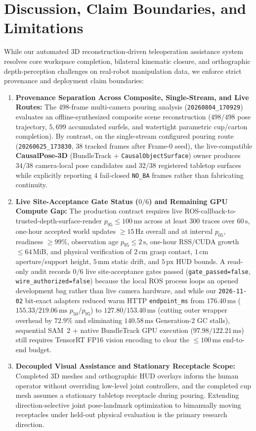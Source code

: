 \documentclass[10pt,journal]{IEEEtran}
\begin{document}
\section{Discussion, Claim Boundaries, and Limitations}
\label{sec:discussion}
While our automated 3D reconstruction-driven teleoperation assistance system resolves core workspace completion, bilateral kinematic closure, and orthographic depth-perception challenges on real-robot manipulation data, we enforce strict provenance and deployment claim boundaries:
\begin{enumerate}
    \item \textbf{Provenance Separation Across Composite, Single-Stream, and Live Routes:} The 498-frame multi-camera pouring analysis (\texttt{20260804\_170929}) evaluates an offline-synthesized composite scene reconstruction ($498/498$ pose trajectory, $5{,}699$ accumulated surfels, and watertight parametric cup/carton completion). By contrast, on the single-stream configured pouring route (\texttt{20260625\_173830}, $38$ tracked frames after Frame-0 seed), the live-compatible \textbf{CausalPose-3D} (BundleTrack + \texttt{CausalObjectSurface}) owner produces $34/38$ camera-local pose candidates and $32/38$ registered tabletop surfaces while explicitly reporting $4$ fail-closed \texttt{NO\_BA} frames rather than fabricating continuity.
    \item \textbf{Live Site-Acceptance Gate Status ($0/6$) and Remaining GPU Compute Gap:} The production contract requires live ROS-callback-to-trusted-depth-surface-render $p_{95} \le 100\,\mathrm{ms}$ across at least $300$ traces over $60\,\mathrm{s}$, one-hour accepted world updates $\ge 15\,\mathrm{Hz}$ overall and at interval $p_{05}$, readiness $\ge 99\%$, observation age $p_{95} \le 2\,\mathrm{s}$, one-hour RSS/CUDA growth $\le 64\,\mathrm{MiB}$, and physical verification of $2\,\mathrm{cm}$ grasp contact, $1\,\mathrm{cm}$ aperture/support height, $5\,\mathrm{mm}$ static drift, and $5\,\mathrm{px}$ HUD bounds. A read-only audit records $0/6$ live site-acceptance gates passed (\texttt{gate\_passed=false}, \texttt{wire\_authorized=false}) because the local ROS process loops an opened development bag rather than live camera hardware, and while our \texttt{2026-11-02} bit-exact adapters reduced warm HTTP \texttt{endpoint\_ms} from $176.40\,\mathrm{ms}$ ($155.33/219.06\,\mathrm{ms}$ $p_{50}/p_{95}$) to $\mathbf{127.80 / 153.40\,\mathrm{ms}}$ (cutting outer wrapper overhead by $72.9\%$ and eliminating $140.58\,\mathrm{ms}$ Generation-2 GC stalls), sequential SAM~2 + native BundleTrack GPU execution ($97.98 / 122.21\,\mathrm{ms}$) still requires TensorRT FP16 vision encoding to clear the $\le 100\,\mathrm{ms}$ end-to-end budget.
    \item \textbf{Decoupled Visual Assistance and Stationary Receptacle Scope:} Completed 3D meshes and orthographic HUD overlays inform the human operator without overriding low-level joint controllers, and the completed cup mesh assumes a stationary tabletop receptacle during pouring. Extending direction-selective joint pose-landmark optimization to bimanually moving receptacles under held-out physical evaluation is the primary research direction.
\end{enumerate}
\end{document}
